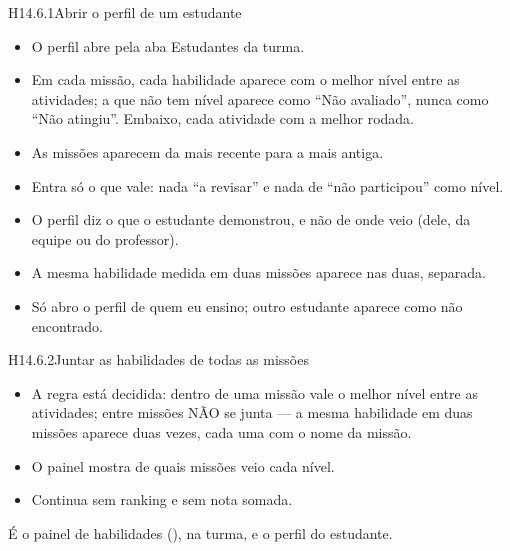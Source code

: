 \begin{historia}{H14.6.1}{Abrir o perfil de um estudante}{\parcial}
\aceite
\begin{itemize}
  \item O perfil abre pela aba Estudantes da turma.
  \item Em cada missão, cada habilidade aparece com o melhor nível entre as
    atividades; a que não tem nível aparece como \enquote{Não avaliado}, nunca
    como \enquote{Não atingiu}. Embaixo, cada atividade com a melhor rodada.
  \item As missões aparecem da mais recente para a mais antiga.
  \item Entra só o que vale: nada \enquote{a revisar} e nada de \enquote{não
    participou} como nível.
  \item O perfil diz o que o estudante demonstrou, e não de onde veio (dele, da
    equipe ou do professor).
  \item A mesma habilidade medida em duas missões aparece nas duas, separada.
  \item Só abro o perfil de quem eu ensino; outro estudante aparece como não
    encontrado.
\end{itemize}
\end{historia}

\begin{historia}{H14.6.2}{Juntar as habilidades de todas as missões}{\pronto}
\aceite
\begin{itemize}
  \item A regra está decidida: dentro de uma missão vale o melhor nível entre
    as atividades; entre missões NÃO se junta --- a mesma habilidade em duas
    missões aparece duas vezes, cada uma com o nome da missão.
  \item O painel mostra de quais missões veio cada nível.
  \item Continua sem ranking e sem nota somada.
\end{itemize}
É o painel de habilidades (), na turma, e o perfil do estudante.
\end{historia}


